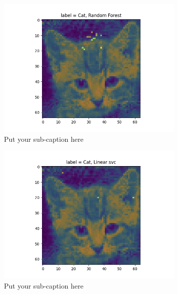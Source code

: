 \documentclass{article}
\begin{document}
\begin{figure}[H]
\begin{subfigure}{.33\textwidth}
  \centering
  \includegraphics[width=1\linewidth]{1e/Cats 5 clusters/impfeat RandomForest.png}  
  \caption{Put your sub-caption here}
  \label{}
\end{subfigure}
\begin{subfigure}{.33\textwidth}
  \centering
  \includegraphics[width=1\linewidth]{1e/Cats 5 clusters/impfeat linear svc bra.png}  
  \caption{Put your sub-caption here}
  \label{fig:sub-second}
\end{subfigure}
\begin{subfigure}{.33\textwidth}

\end{subfigure}
\end{figure}
\end{document}
